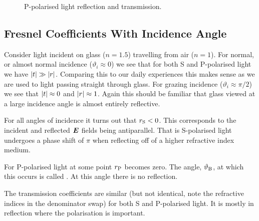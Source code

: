 \begin{figure}[ht]
        \caption{P-polarised light reflection and transmission.}
    \end{figure}

    \subsection{Fresnel Coefficients With Incidence Angle}
    Consider light incident on glass (\(n = 1.5\)) travelling from air (\(n = 1\)).
    For normal, or almost normal incidence (\(\vartheta_i \approx 0\)) we see that for both S and P-polarised light we have \(\abs{t} \gg \abs{r}\).
    Comparing this to our daily experiences this makes sense as we are used to light passing straight through glass.
    For grazing incidence (\(\vartheta_i \approx \pi/2\)) we see that \(\abs{t} \approx 0\) and \(\abs{r} \approx 1\).
    Again this should be familiar that glass viewed at a large incidence angle is almost entirely reflective.
    
    For all angles of incidence it turns out that \({r}_{\mathrm{{S}}} < 0\).
    This corresponds to the incident and reflected \(\bm{E}\) fields being antiparallel.
    That is S-polarised light undergoes a phase shift of \(\pi\) when reflecting off of a higher refractive index medium.
    
    For P-polarised light at some point \({r}_{\mathrm{{P}}}\) becomes zero.
    The angle, \(\vartheta_{\mathrm{B}}\), at which this occurs is called .
    At this angle there is no reflection.
    
    The transmission coefficients are similar (but not identical, note the refractive indices in the denominator swap) for both S and P-polarised light.
    It is mostly in reflection where the polarisation is important.
    
